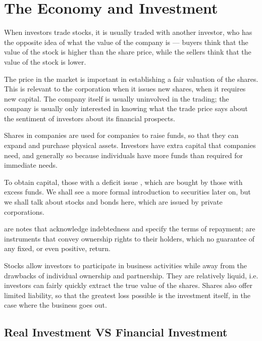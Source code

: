 \documentclass[notoc,notitlepage]{tufte-book}
\begin{document}

\section{The Economy and Investment}%
\label{sec:the_economy_and_investment}

When investors trade stocks, it is usually traded with another investor,
who has the opposite idea of what the value of the company is ---
buyers think that the value of the stock is higher than the share price,
while the sellers think that the value of the stock is lower.

The price in the market is important
in establishing a fair valuation of the shares.
This is relevant to the corporation when it issues new shares,
when it requires new capital.
The company itself is usually uninvolved in the trading;
the company is usually only interested in knowing what the trade price
says about the sentiment of investors about its financial prospects.

Shares in companies are used for companies to raise funds,
so that they can expand and purchase physical assets.
Investors have extra capital that companies need, and generally so
because individuals have more funds than required for immediate needs.

To obtain capital, those with a deficit issue ,
which are bought by those with excess funds.
We shall see a more formal introduction to securities later on,
but we shall talk about stocks and bonds here, which are issued by
private corporations.

 are notes that acknowledge indebtedness and specify
the terms of repayment;  are instruments that convey
ownership rights to their holders,
which no guarantee of any fixed, or even positive, return.

Stocks allow investors to participate in business activities
while away from the drawbacks of individual ownership and partnership.
They are relatively liquid, i.e. investors can fairly quickly
extract the true value of the shares.
Shares also offer limited liability, so that the greatest loss possible
is the investment itself, in the case where the business goes out.

\subsection{Real Investment VS Financial Investment}%
\label{sub:real_investment_vs_financial_investment}
\end{document}
